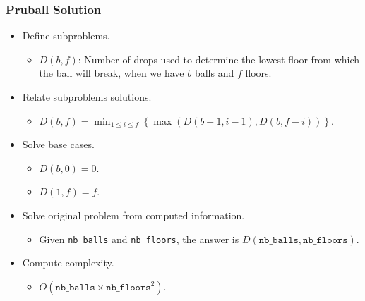 \documentclass{beamer}
\begin{document}
\begin{frame}%
\frametitle{Pruball Solution}

\scriptsize
\begin{itemize}

\item Define subproblems.
\begin{itemize}
\scriptsize
\item $D(b, f)$: Number of drops used to determine the lowest floor from which the ball will break, when
we have $b$ balls and $f$ floors.
\end{itemize}

\vspace{0.1cm}

\item<2-> Relate subproblems solutions.
\begin{itemize}
\scriptsize
\item<2-> $D(b, f) = \min_{1 \le i \le f}\left\{ \max(D(b - 1, i - 1), D(b, f - i)) \right\}$.
\end{itemize}

\vspace{0.1cm}

\item<3-> Solve base cases.
\begin{itemize}
\scriptsize
\item<3-> $D(b, 0) = 0$.
\item<3-> $D(1, f) = f$.
\end{itemize}

\vspace{0.1cm}

\item<4-> Solve original problem from computed information.
\begin{itemize}
\scriptsize
\item<4-> Given \texttt{nb\_balls} and \texttt{nb\_floors}, the answer is $D(\texttt{nb\_balls}, \texttt{nb\_floors})$.
\end{itemize}

\vspace{0.1cm}

\item<5-> Compute complexity.
\begin{itemize}
\scriptsize
\item<5-> $O(\texttt{nb\_balls} \times \texttt{nb\_floors}^2)$.
\end{itemize}

\end{itemize}

\end{frame}
\end{document}
